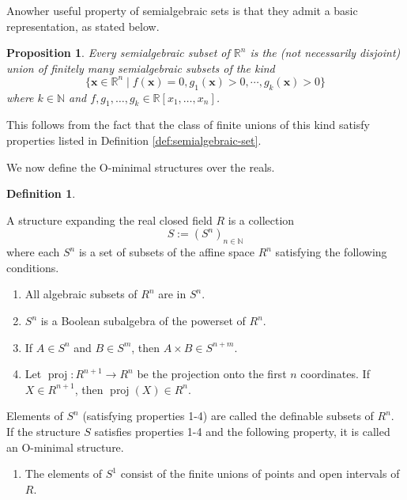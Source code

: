 \documentclass[
]{book}
\providecommand{\tightlist}{%
  \setlength{\itemsep}{0pt}\setlength{\parskip}{0pt}}
\newtheorem{proposition}{Proposition}[chapter]
\theoremstyle{definition}
\newtheorem{definition}{Definition}[chapter]
\theoremstyle{definition}
\theoremstyle{definition}
\theoremstyle{definition}
\theoremstyle{remark}
\begin{document}
Anowher useful property of semialgebraic sets is that they admit a basic representation, as stated below.

\begin{proposition}
\protect\hypertarget{prp:union-of-conjunctionss}{}\label{prp:union-of-conjunctionss}Every semialgebraic subset of \(\mathbb{R}^n\) is the (not necessarily disjoint) union of finitely many semialgebraic subsets of the kind
\[
\{ \mathbf{x} \in \mathbb{R}^n \mid f(\mathbf{x}) = 0, g_1(\mathbf{x}) > 0, \cdots, g_k(\mathbf{x}) > 0 \}
\]
where \(k \in \mathbb{N}\) and \(f,g_1,\ldots,g_k \in \mathbb{R}[x_1,\ldots,x_n]\).
\end{proposition}

This follows from the fact that the class of finite unions of this kind satisfy properties listed in Definition \ref{def:semialgebraic-set}.

We now define the O-minimal structures over the reals.

\begin{definition}
\protect\hypertarget{def:definable-set}{}\label{def:definable-set}

A structure expanding the real closed field \(R\) is a collection \[
S := (S^n)_{n \in \mathbb{N}}
\]
where each \(S^n\) is a set of subsets of the affine space \(R^n\) satisfying the following conditions.

\begin{enumerate}
\def\labelenumi{\arabic{enumi}.}
\tightlist
\item
  All algebraic subsets of \(R^n\) are in \(S^n\).
\item
  \(S^n\) is a Boolean subalgebra of the powerset of \(R^n\).
\item
  If \(A \in S^n\) and \(B \in S^m\), then \(A \times B \in S^{n+m}\).
\item
  Let \(\operatorname{proj}: R^{n+1} \to R^n\) be the projection onto the first \(n\) coordinates. If \(X\in R^{n+1}\), then \(\operatorname{proj}(X) \in R^n\).
\end{enumerate}

Elements of \(S^n\) (satisfying properties 1-4) are called the definable subsets of \(R^n\).
If the structure \(S\) satisfies properties 1-4 and the following property, it is called an O-minimal structure.

\begin{enumerate}
\def\labelenumi{\arabic{enumi}.}
\setcounter{enumi}{4}
\tightlist
\item
  The elements of \(S^1\) consist of the finite unions of points and open intervals of \(R\).
\end{enumerate}

\end{definition}
\end{document}

